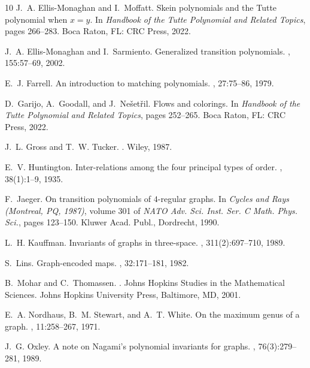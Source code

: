 \documentclass{amsart}
\theoremstyle{definition}
\theoremstyle{remark}
\numberwithin{equation}{section}
\begin{document}
\begin{thebibliography}{10}
J.~A. Ellis-Monaghan and I.~Moffatt.
\newblock Skein polynomials and the {Tutte} polynomial when {{\(x = y\)}}.
\newblock In {\em Handbook of the Tutte Polynomial and Related Topics}, pages 266--283. Boca Raton, FL: CRC Press, 2022.

J.~A. Ellis-Monaghan and I.~Sarmiento.
\newblock Generalized transition polynomials.
, 155:57--69, 2002.

E.~J. Farrell.
\newblock An introduction to matching polynomials.
, 27:75--86, 1979.

D.~Garijo, A.~Goodall, and J.~Ne{\v{s}}et{\v{r}}il.
\newblock Flows and colorings.
\newblock In {\em Handbook of the Tutte Polynomial and Related Topics}, pages 252--265. Boca Raton, FL: CRC Press, 2022.

J.~L. Gross and T.~W. Tucker.
.
\newblock Wiley, 1987.

E.~V. Huntington.
\newblock Inter-relations among the four principal types of order.
, 38(1):1--9, 1935.

F.~Jaeger.
\newblock On transition polynomials of {$4$}-regular graphs.
\newblock In {\em Cycles and {R}ays ({M}ontreal, {PQ}, 1987)}, volume 301 of {\em NATO Adv. Sci. Inst. Ser. C Math. Phys. Sci.}, pages 123--150. Kluwer Acad. Publ., Dordrecht, 1990.

L.~H. Kauffman.
\newblock Invariants of graphs in three-space.
, 311(2):697--710, 1989.

S.~Lins.
\newblock Graph-encoded maps.
, 32:171--181, 1982.

B.~Mohar and C.~Thomassen.
.
\newblock Johns Hopkins Studies in the Mathematical Sciences. Johns Hopkins University Press, Baltimore, MD, 2001.

E.~A. Nordhaus, B.~M. Stewart, and A.~T. White.
\newblock On the maximum genus of a graph.
, 11:258--267, 1971.

J.~G. Oxley.
\newblock A note on {Nagami}'s polynomial invariants for graphs.
, 76(3):279--281, 1989.


\end{thebibliography}
\end{document}
